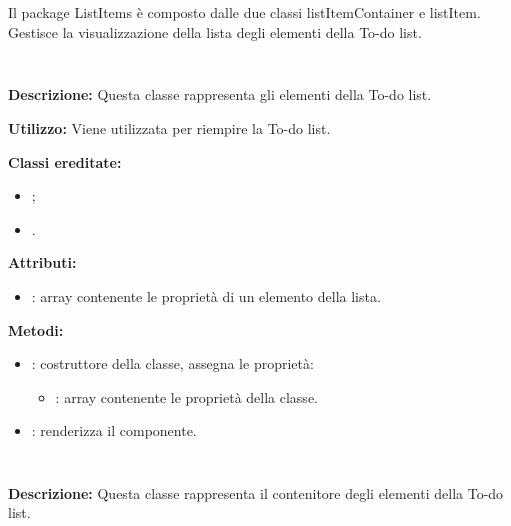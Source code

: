 \paragraph[::ListItems]{\class}\mbox{}\\ \label{\class}
Il package ListItems è composto dalle due classi listItemContainer e listItem. Gestisce la visualizzazione della lista degli elementi della To-do list.

\subparagraph[::listItem]{\class}\mbox{}\\ \label{\class}
\textbf{Descrizione:}
Questa classe rappresenta gli elementi della To-do list.

\textbf{Utilizzo:}
Viene utilizzata per riempire la To-do list.

\textbf{Classi ereditate:}
\begin{itemize}
	\item {};
	\item {}.
\end{itemize}

\textbf{Attributi:}
\begin{itemize}
	\item {}: array contenente le proprietà di un elemento della lista.
\end{itemize}

\textbf{Metodi:}
\begin{itemize}
	\item {}: costruttore della classe, assegna le proprietà:
	\begin{itemize}
		\item {}: array contenente le proprietà della classe.
	\end{itemize}
	\item {}: renderizza il componente.
\end{itemize}

\subparagraph[::listItemContainer]{\class}\mbox{}\\ \label{\class}
\textbf{Descrizione:}
Questa classe rappresenta il contenitore degli elementi della To-do list.

